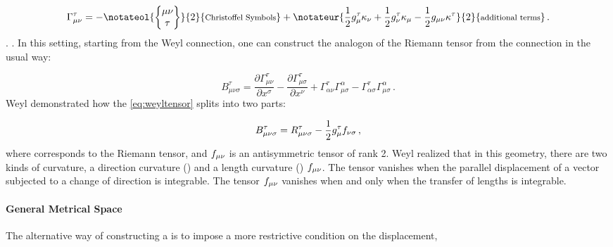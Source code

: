 \documentclass[final]{article}
\newcommand{\faradaymn}{\ensuremath{f\mn}}
\newcommand{\faraday}{\ensuremath{f}}
\begin{document}
\begin{equation}\label{eq:weylconnection}
\Gtmn=-\notateol{\christoffel{\mu}{\nu}{\tau}}{2}{\texts{Christoffel Symbols}}+\notateur{\frac{1}{2} g_{\mu}^{\tau} \kappa_{\nu}+\frac{1}{2} g_{\nu}^{\tau} \kappa_{\mu}-\frac{1}{2} \gmn \kappa^{\tau}}{2}{\texts{additional terms}} \,.
\end{equation}
%
. . In this setting, starting from the Weyl connection, one can construct the analogon of the Riemann tensor from the connection in the usual way:
 
\begin{equation}\label{eq:weyltensor} 
B_{\mu \nu \sigma}^{\tau} =\frac{\partial \Gamma_{\mu \nu}^{\tau}}{\partial x^{\sigma}}-\frac{\partial \Gamma_{\mu \sigma}^{\tau}}{\partial x^{\nu}}+\Gamma_{\alpha \nu}^{\tau} \Gamma_{\mu \sigma}^{\alpha}-\Gamma_{\alpha \sigma}^{\tau} \Gamma_{\mu \sigma}^{\alpha}\,.
\end{equation}
%
Weyl demonstrated how the \cref{eq:weyltensor} splits into two parts:

\begin{equation*}
B_{\mu \nu \sigma}^{\tau} = \rite - \frac{1}{2} g^\tau_\mu \faraday_{\nu\sigma}\,,
\end{equation*}
%
where \rite corresponds to the Riemann tensor, and $\faradaymn$ is an antisymmetric tensor of rank 2. Weyl realized that in this geometry, there are two kinds of curvature, a direction curvature () \rite and a length curvature () $\faradaymn$. The tensor \rite vanishes when the parallel displacement of a vector subjected to a change of direction is integrable. The tensor $\faradaymn$ vanishes when and only when the transfer of lengths is integrable.


\paragraph{General Metrical Space} The alternative way of constructing a  is to impose a more restrictive condition on the displacement,
\end{document}
